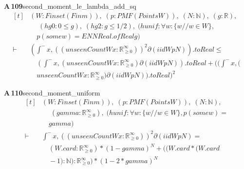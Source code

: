 \documentclass[conference]{IEEEtran}
\theoremstyle{definition}
\newcommand{\lean}[1]{\textsf{\footnotesize #1}}
\begin{document}
\noindent\textbf{A\,109}\quad\lean{second\_moment\_le\_lambda\_add\_sq}
{\footnotesize\[ \begin{aligned}[t]
&(\mathit{W} : \mathit{Finset} (\mathit{Fin} \mathit{m})),\; (\mathit{p} : \mathit{PMF} (\mathit{Points} \mathit{W})),\; (\mathit{N} : \mathbb{N} ),\; (\mathit{g} : \mathbb{R} ),\\
&\quad \; (\mathit{hg0} : 0 \leq \mathit{g}),\; (\mathit{hg2} : \mathit{g} \leq 1/2),\; (\mathit{hunif} : \forall \mathit{w} : \{ \mathit{w} // \mathit{w} \in \mathit{W}\} ,\\
&\quad \mathit{p} (\mathit{some} \mathit{w}) = \mathit{ENNReal}.\mathit{ofReal} \mathit{g})\\
\vdash\;&(\int^{-} \mathit{x}, ((\mathit{unseenCount} \mathit{W} \mathit{x} : \mathbb{R}_{\geq0}^{\infty} ))^{2} ∂(\mathit{iid} \mathit{W} \mathit{p} \mathit{N})).\mathit{toReal} \leq\\
&\quad (\int^{-} \mathit{x}, (\mathit{unseenCount} \mathit{W} \mathit{x} : \mathbb{R}_{\geq0}^{\infty} ) ∂(\mathit{iid} \mathit{W} \mathit{p} \mathit{N})).\mathit{toReal} + ((\int^{-} \mathit{x}, (\\
&\quad \mathit{unseenCount} \mathit{W} \mathit{x} : \mathbb{R}_{\geq0}^{\infty} ) ∂(\mathit{iid} \mathit{W} \mathit{p} \mathit{N})).\mathit{toReal})^{2}
\end{aligned} \]}

\noindent\textbf{A\,110}\quad\lean{second\_moment\_uniform}
{\footnotesize\[ \begin{aligned}[t]
&(\mathit{W} : \mathit{Finset} (\mathit{Fin} \mathit{m})),\; (\mathit{p} : \mathit{PMF} (\mathit{Points} \mathit{W})),\; (\mathit{N} : \mathbb{N} ),\\
&\quad \; (\mathit{gamma} : \mathbb{R}_{\geq0}^{\infty} ),\; (\mathit{hunif} : \forall \mathit{w} : \{ \mathit{w} // \mathit{w} \in \mathit{W}\} , \mathit{p} (\mathit{some} \mathit{w}) =\\
&\quad \mathit{gamma})\\
\vdash\;&\int^{-} \mathit{x}, ((\mathit{unseenCount} \mathit{W} \mathit{x} : \mathbb{R}_{\geq0}^{\infty} ))^{2} ∂(\mathit{iid} \mathit{W} \mathit{p} \mathit{N}) =\\
&\quad (\mathit{W}.\mathit{card} : \mathbb{R}_{\geq0}^{\infty} ) * (1 - \mathit{gamma})^{\mathit{N}} + ((\mathit{W}.\mathit{card} * (\mathit{W}.\mathit{card}\\
&\quad - 1) : \mathbb{N} ) : \mathbb{R}_{\geq0}^{\infty} ) * (1 - 2 * \mathit{gamma})^{\mathit{N}}
\end{aligned} \]}
\end{document}
